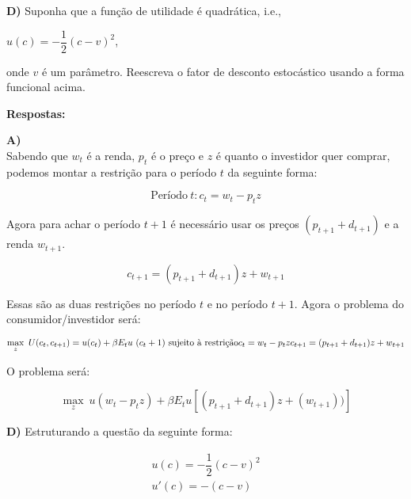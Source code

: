 \singlespacing

\textbf{D)} Suponha que a função de utilidade é quadrática, i.e.,

\begin{center}
	$u(c) = -\dfrac{1}{2}(c - v)^{2}$,
\end{center}

onde $v$ é um parâmetro. Reescreva o fator de desconto estocástico usando a forma funcional acima.

\singlespacing
\textbf{Respostas:}

\textbf{A)}
\\
Sabendo que $w_{t}$ é a renda, $p_{t}$ é o preço e $z$ é quanto o investidor quer comprar, podemos montar a restrição para o período $t$ da seguinte forma:

\begin{equation}
	\text{Período} \ t: c_{t} = w_{t} -  p_{t}z
\end{equation}

Agora para achar o período $t + 1$ é necessário usar os preços $(p_{t + 1} + d_{t + 1})$ e a renda $w_{t + 1}$.

\begin{equation}
	c_{t + 1} = (p_{t + 1} + d_{t + 1})z + w_{t + 1}
\end{equation}

Essas são as duas restrições no período $t$ e no período $t + 1$. Agora o problema do consumidor/investidor será:

\begin{equation}
\max_{z} \  U(c_{t}, c_{t + 1}) = u(c_{t}) + \beta E_{t}u \ (c_{t} + 1) \ \text{sujeito à restrição}
$$\\$$
c_{t} = w_{t} - p_{t}z
$$\\$$
c_{t + 1} = (p_{t + 1} + d_{t + 1})z + w_{t + 1}
\end{equation}

O problema será: 

\begin{equation}
	\max_{z} \ u(w_{t} - p_{t}z) + \beta E_{t}u [(p_{t + 1} + d_{t + 1})z + (w_{t + 1}))]
\end{equation}

\singlespacing

\textbf{D)} Estruturando a questão da seguinte forma:

\begin{equation}
\begin{aligned}
u(c) = -\dfrac{1}{2}(c - v)^{2}
\\
u'(c) = -(c - v)
\end{aligned}
\end{equation}

